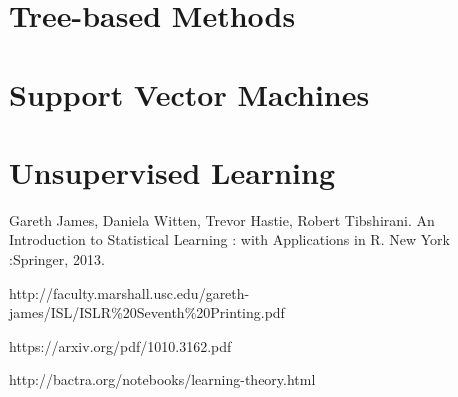\documentclass{article}
\newcommand{\comment}[1]{}
\numberwithin{equation}{section}
\begin{document}
\begin{enumerate}
\newpage
\section{Tree-based Methods}

\newpage
\section{Support Vector Machines}

\newpage
\section{Unsupervised Learning}

\end{enumerate}


\comment{
- left off: pg 47, video:  Lect3 4b 110613
- 
}


\newpage
\begin{thebibliography}{}
\bibitem[]{}
Gareth James, Daniela Witten, Trevor Hastie, Robert Tibshirani. An Introduction to Statistical Learning : with Applications in R. New York :Springer, 2013.


http://faculty.marshall.usc.edu/gareth-james/ISL/ISLR\%20Seventh\%20Printing.pdf


\bibitem[]{}
https://arxiv.org/pdf/1010.3162.pdf

\bibitem[]{}
http://bactra.org/notebooks/learning-theory.html

\end{thebibliography}
\end{document}
